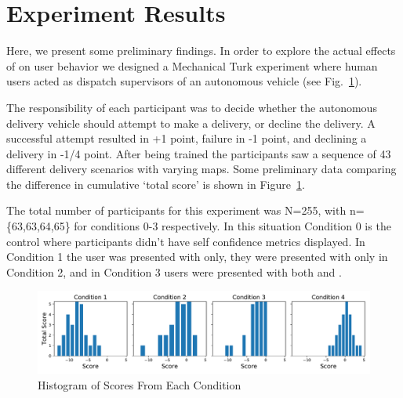 \section{Experiment Results} \label{sec:exp_results}
Here, we present some preliminary findings. In order to explore the actual effects of \famsec{} on user behavior we designed a Mechanical Turk experiment where human users acted as dispatch supervisors of an autonomous vehicle (see Fig.~\ref{fig:experiment}). 

The responsibility of each participant was to decide whether the autonomous delivery vehicle should attempt to make a delivery, or decline the delivery. A successful attempt resulted in +1 point, failure in -1 point, and declining a delivery in -1/4 point. After being trained the participants saw a sequence of 43 different delivery scenarios with varying maps. Some preliminary data comparing the difference in cumulative `total score' is shown in Figure~\ref{fig:experiment}.

The total number of participants for this experiment was N=255, with n=\{63,63,64,65\} for conditions 0-3 respectively. In this situation Condition 0 is the control where participants didn't have self confidence metrics displayed. In Condition 1 the user was presented with \xQ{} only, they were presented with \xP{} only in Condition 2, and in Condition 3 users were presented with both \xQ{} and \xP{}.

\begin{figure}[tbp]
    \centering
    \includegraphics[width=1.0\linewidth]{Figures/test.pdf}
    \caption{Histogram of Scores From Each Condition}
    \label{fig:experiment}
\end{figure}

